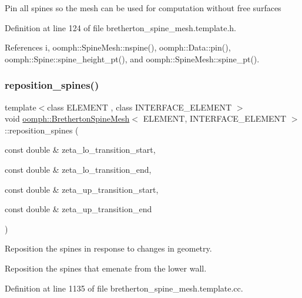 Pin all spines so the mesh can be used for computation without free surfaces 

Definition at line 124 of file bretherton\+\_\+spine\+\_\+mesh.\+template.\+h.



References i, oomph\+::\+Spine\+Mesh\+::nspine(), oomph\+::\+Data\+::pin(), oomph\+::\+Spine\+::spine\+\_\+height\+\_\+pt(), and oomph\+::\+Spine\+Mesh\+::spine\+\_\+pt().

\mbox{\label{classoomph_1_1BrethertonSpineMesh_a0dfeac5bc9a4fa4bfdcd443def30dcdb}} 
\subsubsection{\texorpdfstring{reposition\+\_\+spines()}{reposition\_spines()}}
{\footnotesize\ttfamily template$<$class E\+L\+E\+M\+E\+NT , class I\+N\+T\+E\+R\+F\+A\+C\+E\+\_\+\+E\+L\+E\+M\+E\+NT $>$ \\
void \hyperlink{classoomph_1_1BrethertonSpineMesh}{oomph\+::\+Bretherton\+Spine\+Mesh}$<$ E\+L\+E\+M\+E\+NT, I\+N\+T\+E\+R\+F\+A\+C\+E\+\_\+\+E\+L\+E\+M\+E\+NT $>$\+::reposition\+\_\+spines (\begin{DoxyParamCaption}\item[{const double \&}]{zeta\+\_\+lo\+\_\+transition\+\_\+start,  }\item[{const double \&}]{zeta\+\_\+lo\+\_\+transition\+\_\+end,  }\item[{const double \&}]{zeta\+\_\+up\+\_\+transition\+\_\+start,  }\item[{const double \&}]{zeta\+\_\+up\+\_\+transition\+\_\+end }\end{DoxyParamCaption})}



Reposition the spines in response to changes in geometry. 

Reposition the spines that emenate from the lower wall. 

Definition at line 1135 of file bretherton\+\_\+spine\+\_\+mesh.\+template.\+cc.



